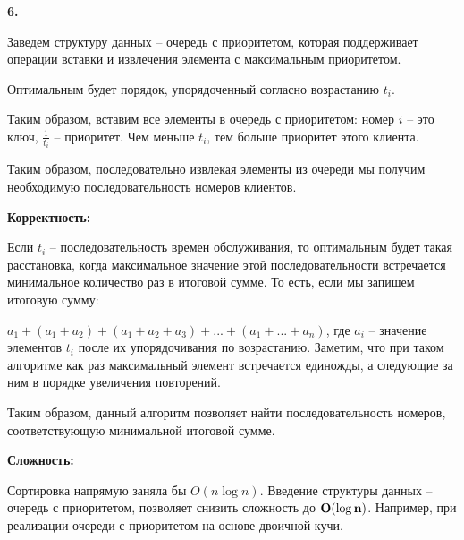 \documentclass[12pt]{extreport}
\begin{document}
\bigskip

{\bf 6.} 

Заведем структуру данных -- очередь с приоритетом, которая поддерживает операции вставки и извлечения элемента с максимальным приоритетом.

Оптимальным будет порядок, упорядоченный согласно возрастанию $t_i$.

Таким образом, вставим все элементы в очередь с приоритетом: номер $i$ -- это ключ, $\frac{1}{t_i}$ -- приоритет. Чем меньше $t_i$, тем больше приоритет этого клиента. 

Таким образом, последовательно извлекая элементы из очереди мы получим необходимую последовательность номеров клиентов. 

\bigskip 
{\bf Корректность:}

Если $t_i$ -- последовательность времен обслуживания, то оптимальным будет такая расстановка, когда максимальное значение этой последовательности встречается минимальное количество раз в итоговой сумме. То есть, если мы запишем итоговую сумму: 

$a_1 + (a_1 + a_2) + (a_1+a_2+a_3) + ... + (a_1 + ... + a_n)$, где $a_i$ -- значение элементов $t_i$ после их упорядочивания по возрастанию. Заметим, что при таком алгоритме как раз максимальный элемент встречается единожды, а следующие за ним в порядке увеличения повторений. 

Таким образом, данный алгоритм позволяет найти последовательность номеров, соответствующую минимальной итоговой сумме. 

\bigskip 
{\bf Сложность:} 

Сортировка напрямую заняла бы $O(n \log n)$. Введение структуры данных -- очередь с приоритетом, позволяет снизить сложность до ${\bf O(\log n)}$. Например, при реализации очереди с приоритетом на основе двоичной кучи.
\end{document}
